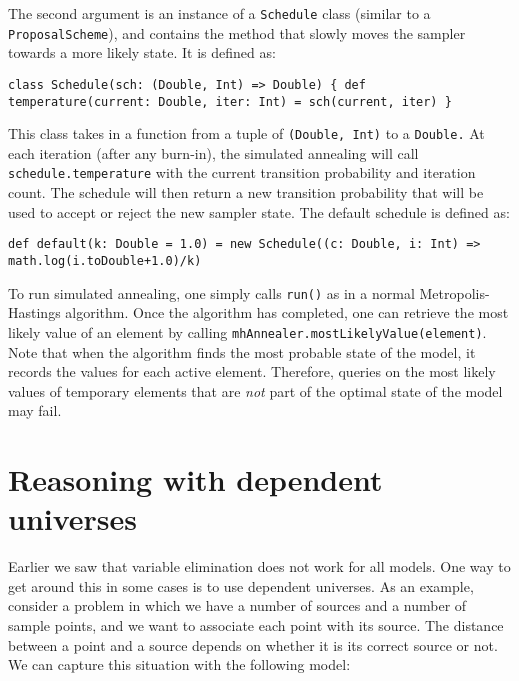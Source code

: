 The second argument is an instance of a \texttt{Schedule} class (similar to a \texttt{ProposalScheme}), and contains the method that slowly moves the sampler towards a more likely state. It is defined as:

\begin{flushleft}
\texttt{class Schedule(sch: (Double, Int) => Double) \{
\newline \tab def temperature(current: Double, iter: Int) = sch(current, iter)
\newline \} }
\end{flushleft}

This class takes in a function from a tuple of  \texttt{(Double, Int)} to a \texttt{Double.} At each iteration (after any burn-in), the simulated annealing will call \texttt{schedule.temperature} with the current transition probability and iteration count. The schedule will then return a new transition probability that will be used to accept or reject the new sampler state. The default schedule is defined as:

\begin{flushleft}
\texttt{def default(k: Double = 1.0) = new Schedule((c: Double, i: Int) 
\newline \tab => math.log(i.toDouble+1.0)/k)}
\end{flushleft}

To run simulated annealing, one simply calls \texttt{run()} as in a normal Metropolis-Hastings algorithm. Once the algorithm has completed, one can retrieve the most likely value of an element by calling \texttt{mhAnneal\-er.mostLikelyValue(element)}. Note that when the algorithm finds the most probable state of the model, it records the values for each active element. Therefore, queries on the most likely values of temporary elements that are \emph{not} part of the optimal state of the model may fail.

\section{Reasoning with dependent universes}

Earlier we saw that variable elimination does not work for all models. One way to get around this in some cases is to use dependent universes. As an example, consider a problem in which we have a number of sources and a number of sample points, and we want to associate each point with its source. The distance between a point and a source depends on whether it is its correct source or not. We can capture this situation with the following model:

